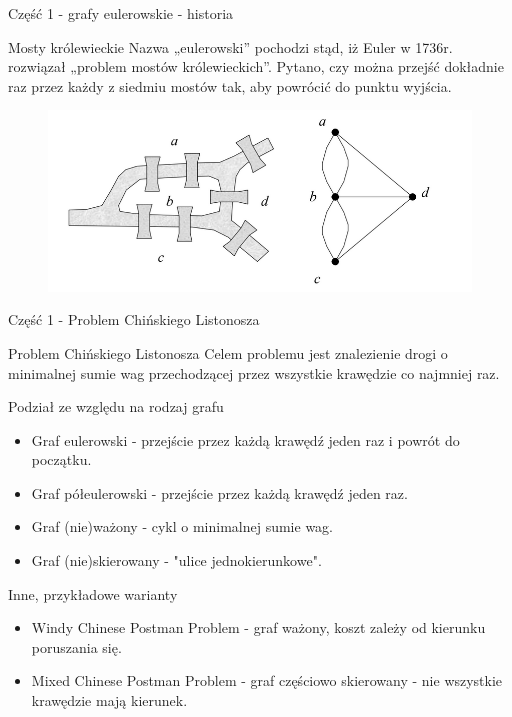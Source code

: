 \documentclass[polish,envcountsect,10pt]{beamer}
\begin{document}
\begin{frame}{Część 1 - grafy eulerowskie - historia}
    \begin{block}{Mosty królewieckie}
        Nazwa „eulerowski” pochodzi stąd, iż Euler w 1736r. rozwiązał „problem
        mostów królewieckich”. Pytano, czy można przejść dokładnie raz przez
        każdy z siedmiu mostów tak, aby powrócić do punktu wyjścia.
    \end{block}
    \begin{figure}
        \centering
        \includegraphics[width=0.7\linewidth]{./zal_a.png}
    \end{figure}
\end{frame}

\begin{frame}{Część 1 - Problem Chińskiego Listonosza}
    \begin{block}{Problem Chińskiego Listonosza}
        Celem problemu jest znalezienie drogi o minimalnej sumie wag przechodzącej przez wszystkie krawędzie co najmniej raz.
    \end{block}
    \begin{block}{Podział ze względu na rodzaj grafu}
        \begin{itemize}
            \item Graf eulerowski - przejście przez każdą krawędź jeden raz i powrót do początku.
            \item Graf półeulerowski - przejście przez każdą krawędź jeden raz.
            \item Graf (nie)ważony - cykl o minimalnej sumie wag.
            \item Graf (nie)skierowany - "ulice jednokierunkowe".
        \end{itemize}
    \end{block}
    \begin{block}{Inne, przykładowe warianty}
        \begin{itemize}
            \item Windy Chinese Postman Problem - graf ważony, koszt zależy od kierunku poruszania się.
            \item Mixed Chinese Postman Problem - graf częściowo skierowany - nie wszystkie krawędzie mają kierunek.
        \end{itemize}
    \end{block}
\end{frame}
\end{document}
